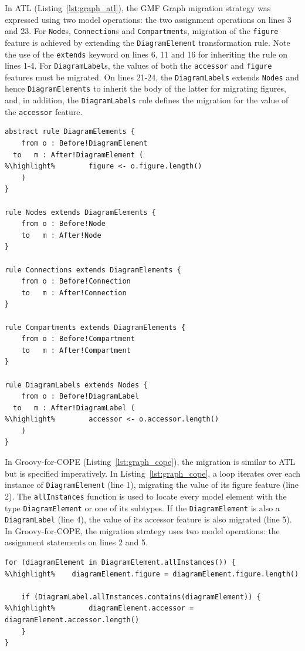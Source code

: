 In ATL (Listing~\ref{lst:graph_atl}), the GMF Graph migration strategy was expressed using two model operations: the two assignment operations on lines 3 and 23. For \texttt{Node}s, \texttt{Connection}s and \texttt{Compartment}s, migration of the \texttt{figure} feature is achieved by extending the \texttt{DiagramElement} transformation rule. Note the use of the \texttt{extends} keyword on lines 6, 11 and 16 for inheriting the rule on lines 1-4. For \texttt{DiagramLabel}s, the values of both the \texttt{accessor} and \texttt{figure} features must be migrated. On lines 21-24, the \texttt{DiagramLabels} extends \texttt{Nodes} and hence \texttt{DiagramElements} to inherit the body of the latter for migrating figures, and, in addition, the \texttt{DiagramLabels} rule defines the migration for the value of the \texttt{accessor} feature.

\begin{lstlisting}[float=tbp, caption=Simplified GMF Graph model migration in ATL, label=lst:graph_atl, language=ATL, tabsize=2]
abstract rule DiagramElements {
	from o : Before!DiagramElement
  to   m : After!DiagramElement (
%\highlight% 		figure <- o.figure.length()
	)
}

rule Nodes extends DiagramElements {
	from o : Before!Node
	to   m : After!Node
}

rule Connections extends DiagramElements {
	from o : Before!Connection
	to   m : After!Connection
}

rule Compartments extends DiagramElements {
	from o : Before!Compartment
	to   m : After!Compartment
}

rule DiagramLabels extends Nodes {
	from o : Before!DiagramLabel
  to   m : After!DiagramLabel (
%\highlight%		accessor <- o.accessor.length()
	)
}
\end{lstlisting}

In Groovy-for-COPE (Listing~\ref{lst:graph_cope}), the migration is similar to ATL but is specified imperatively. In Listing~\ref{lst:graph_cope}, a loop iterates over each instance of \texttt{DiagramElement} (line 1), migrating the value of its figure feature (line 2). The \texttt{allInstances} function is used to locate every model element with the type \texttt{DiagramElement} or one of its subtypes. If the \texttt{DiagramElement} is also a \texttt{DiagramLabel} (line 4), the value of its accessor feature is also migrated (line 5). In Groovy-for-COPE, the migration strategy uses two model operations: the assignment statements on lines 2 and 5. 

\begin{lstlisting}[float=tbp, caption=Simplified GMF Graph model migration in COPE, label=lst:graph_cope, language=COPE, tabsize=2]
for (diagramElement in DiagramElement.allInstances()) {
%\highlight%	diagramElement.figure = diagramElement.figure.length()
	
	if (DiagramLabel.allInstances.contains(diagramElement)) {
%\highlight%		diagramElement.accessor = diagramElement.accessor.length()
	}
}
\end{lstlisting}


